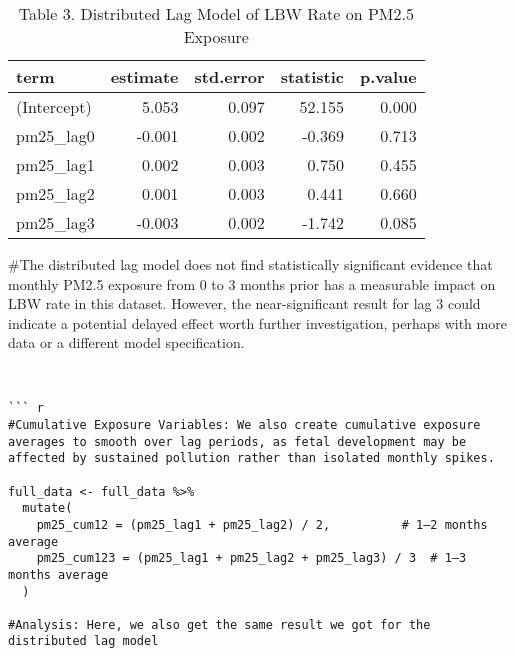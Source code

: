 \documentclass[
]{article}
\begin{document}
\begin{longtable}[t]{lrrrr}
\caption{\label{tab:Distributed Lag Model}Table 3. Distributed Lag Model of LBW Rate on PM2.5 Exposure}\\
\toprule
term & estimate & std.error & statistic & p.value\\
\midrule
(Intercept) & 5.053 & 0.097 & 52.155 & 0.000\\
pm25\_lag0 & -0.001 & 0.002 & -0.369 & 0.713\\
pm25\_lag1 & 0.002 & 0.003 & 0.750 & 0.455\\
pm25\_lag2 & 0.001 & 0.003 & 0.441 & 0.660\\
pm25\_lag3 & -0.003 & 0.002 & -1.742 & 0.085\\
\bottomrule
\end{longtable}

\#The distributed lag model does not find statistically significant
evidence that monthly PM2.5 exposure from 0 to 3 months prior has a
measurable impact on LBW rate in this dataset. However, the
near-significant result for lag 3 could indicate a potential delayed
effect worth further investigation, perhaps with more data or a
different model specification.

\begin{verbatim}


``` r
#Cumulative Exposure Variables: We also create cumulative exposure averages to smooth over lag periods, as fetal development may be affected by sustained pollution rather than isolated monthly spikes.

full_data <- full_data %>%
  mutate(
    pm25_cum12 = (pm25_lag1 + pm25_lag2) / 2,          # 1–2 months average
    pm25_cum123 = (pm25_lag1 + pm25_lag2 + pm25_lag3) / 3  # 1–3 months average
  )
  
#Analysis: Here, we also get the same result we got for the distributed lag model
\end{verbatim}
\end{document}
